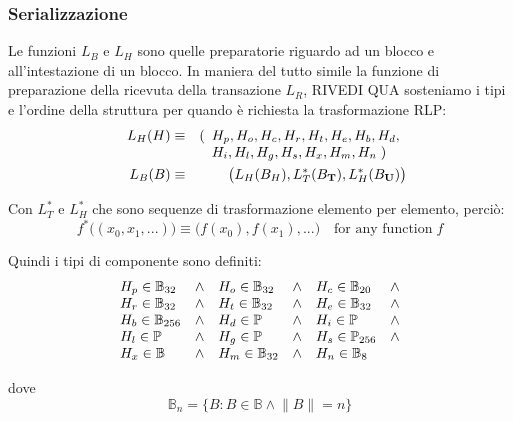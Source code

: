 \documentclass[9pt,oneside]{amsart}
\begin{document}
\begin{multicols}{2}
\subsubsection{Serializzazione}

Le funzioni $L_B$ e $L_H$ sono quelle preparatorie riguardo ad un blocco e all'intestazione di un blocco. In maniera del tutto simile la funzione di preparazione della ricevuta della transazione $L_R$, RIVEDI QUA sosteniamo i tipi e l'ordine della struttura per quando è richiesta la trasformazione RLP:
\begin{eqnarray}
\quad L_H(H) & \equiv & (\begin{array}[t]{l}H_p, H_o, H_c, H_r, H_t, H_e, H_b, H_d,\\ H_i, H_l, H_g, H_s, H_x, H_m, H_n \; )\end{array} \\
\quad L_B(B) & \equiv & \big( L_H(B_H), L_T^*(B_\mathbf{T}), L_H^*(B_\mathbf{U}) \big)
\end{eqnarray}

Con $L_T^*$ e $L_H^*$ che sono sequenze di trasformazione elemento per elemento, perciò:
\begin{equation}
f^*\big( (x_0, x_1, ...) \big) \equiv \big( f(x_0), f(x_1), ... \big) \quad \text{for any function} \; f
\end{equation}

Quindi i tipi di componente sono definiti:
\begin{equation}
\begin{array}[t]{lclclcl}
H_p \in \mathbb{B}_{32} & \wedge & H_o \in \mathbb{B}_{32} & \wedge & H_c \in \mathbb{B}_{20} & \wedge \\
H_r \in \mathbb{B}_{32} & \wedge & H_t \in \mathbb{B}_{32} & \wedge & H_e \in \mathbb{B}_{32} & \wedge \\
H_b \in \mathbb{B}_{256} & \wedge & H_d \in \mathbb{P} & \wedge & H_i \in \mathbb{P} & \wedge \\
H_l \in \mathbb{P} & \wedge & H_g \in \mathbb{P} & \wedge & H_s \in \mathbb{P}_{256} & \wedge \\
H_x \in \mathbb{B} & \wedge & H_m \in \mathbb{B}_{32} & \wedge & H_n \in \mathbb{B}_{8}
\end{array}
\end{equation}

dove
\begin{equation}
\mathbb{B}_n = \{ B: B \in \mathbb{B} \wedge \lVert B \rVert = n \}
\end{equation}


\end{multicols}
\end{document}
